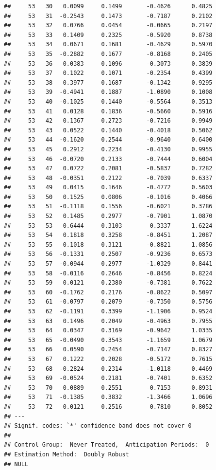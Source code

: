 \documentclass[
]{article}
\begin{document}
\begin{verbatim}
##     53   30   0.0099     0.1499       -0.4626      0.4825  
##     53   31  -0.2543     0.1473       -0.7187      0.2102  
##     53   32   0.0766     0.0454       -0.0665      0.2197  
##     53   33   0.1409     0.2325       -0.5920      0.8738  
##     53   34   0.0671     0.1681       -0.4629      0.5970  
##     53   35  -0.2882     0.1677       -0.8168      0.2405  
##     53   36   0.0383     0.1096       -0.3073      0.3839  
##     53   37   0.1022     0.1071       -0.2354      0.4399  
##     53   38   0.3977     0.1687       -0.1342      0.9295  
##     53   39  -0.4941     0.1887       -1.0890      0.1008  
##     53   40  -0.1025     0.1440       -0.5564      0.3513  
##     53   41   0.0128     0.1836       -0.5660      0.5916  
##     53   42   0.1367     0.2723       -0.7216      0.9949  
##     53   43   0.0522     0.1440       -0.4018      0.5062  
##     53   44  -0.1620     0.2544       -0.9640      0.6400  
##     53   45   0.2912     0.2234       -0.4130      0.9955  
##     53   46  -0.0720     0.2133       -0.7444      0.6004  
##     53   47   0.0722     0.2081       -0.5837      0.7282  
##     53   48  -0.0351     0.2122       -0.7039      0.6337  
##     53   49   0.0415     0.1646       -0.4772      0.5603  
##     53   50   0.1525     0.0806       -0.1016      0.4066  
##     53   51  -0.1118     0.1556       -0.6021      0.3786  
##     53   52   0.1485     0.2977       -0.7901      1.0870  
##     53   53   0.6444     0.3103       -0.3337      1.6224  
##     53   54   0.1818     0.3258       -0.8451      1.2087  
##     53   55   0.1018     0.3121       -0.8821      1.0856  
##     53   56  -0.1331     0.2507       -0.9236      0.6573  
##     53   57  -0.0944     0.2977       -1.0329      0.8441  
##     53   58  -0.0116     0.2646       -0.8456      0.8224  
##     53   59   0.0121     0.2380       -0.7381      0.7622  
##     53   60  -0.1762     0.2176       -0.8622      0.5097  
##     53   61  -0.0797     0.2079       -0.7350      0.5756  
##     53   62  -0.1191     0.3399       -1.1906      0.9524  
##     53   63   0.1496     0.2049       -0.4963      0.7955  
##     53   64   0.0347     0.3169       -0.9642      1.0335  
##     53   65  -0.0490     0.3543       -1.1659      1.0679  
##     53   66   0.0590     0.2454       -0.7147      0.8327  
##     53   67   0.1222     0.2028       -0.5172      0.7615  
##     53   68  -0.2824     0.2314       -1.0118      0.4469  
##     53   69  -0.0524     0.2181       -0.7401      0.6352  
##     53   70   0.0889     0.2551       -0.7153      0.8931  
##     53   71  -0.1385     0.3832       -1.3466      1.0696  
##     53   72   0.0121     0.2516       -0.7810      0.8052  
## ---
## Signif. codes: `*' confidence band does not cover 0
## 
## Control Group:  Never Treated,  Anticipation Periods:  0
## Estimation Method:  Doubly Robust
## NULL
\end{verbatim}
\end{document}
